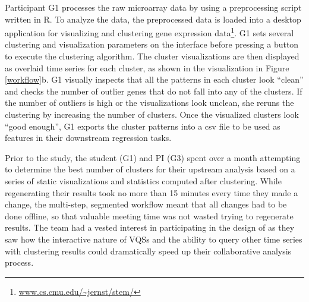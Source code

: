  Participant G1 processes the raw microarray data by using a preprocessing script written in R. To analyze the data, the preprocessed data is loaded into a desktop application for visualizing and clustering gene expression data\footnote{ \url{www.cs.cmu.edu/~jernst/stem/}}. G1 sets several clustering and visualization parameters on the interface before pressing a button to execute the clustering algorithm. The cluster visualizations are then displayed as overlaid time series for each cluster, as shown in the visualization in Figure \ref{workflow}b. G1 visually inspects that all the patterns in each cluster look ``clean'' and checks the number of outlier genes that do not fall into any of the clusters.  If the number of outliers is high or the visualizations look unclean, she reruns the clustering by increasing the number of clusters. Once the visualized clusters look ``good enough'', G1 exports the cluster patterns into a csv file to be used as features in their downstream regression tasks.
\par Prior to the study, the student (G1) and PI (G3) spent over a month attempting to determine the best number of clusters for their upstream analysis based on a series of static visualizations and statistics computed after clustering. While regenerating their results took no more than 15 minutes every time they made a change, the multi-step, segmented workflow meant that all changes had to be done offline, so that valuable meeting time was not wasted trying to regenerate results. The team had a vested interest in participating in the design of \zv as they saw how the interactive nature of VQSs and the ability to query other time series with clustering results could dramatically speed up their collaborative analysis process. 

